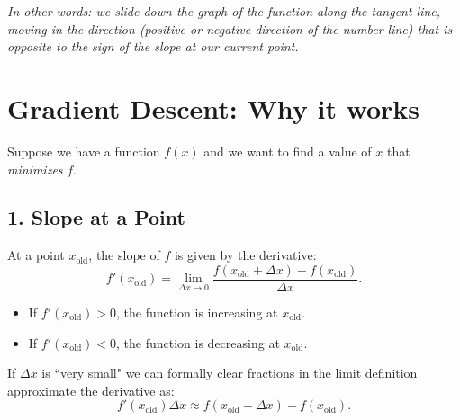 \documentclass[11pt]{article}
\begin{document}
\emph{In other words: we slide down the graph of the function along the tangent line, moving in the direction (positive or negative direction of the number line) that is opposite to the sign of the slope at our current point.}

\section*{Gradient Descent: Why it works}

Suppose we have a function $f(x)$ and we want to find a value of $x$ that \emph{minimizes} $f$.  

\subsection*{1. Slope at a Point}

At a point $x_{\text{old}}$, the slope of $f$ is given by the derivative:
\[
f'(x_{\text{old}}) = \lim_{\Delta x \to 0} \frac{f(x_{\text{old}}+\Delta x) - f(x_{\text{old}})}{\Delta x}.
\]
\begin{itemize}
\item If $f'(x_{\text{old}}) > 0$, the function is increasing at $x_{\text{old}}$.
\item If $f'(x_{\text{old}}) < 0$, the function is decreasing at $x_{\text{old}}$.
\end{itemize}


If $\Delta x$ is ``very small" we can formally clear fractions in the limit definition approximate the derivative as:
\[
f'(x_{\text{old}})\Delta x \approx f(x_{\text{old}}+\Delta x) - f(x_{\text{old}}).
\]
\end{document}
